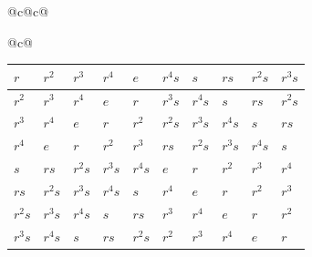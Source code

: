 \documentclass[12pt,UTF8,fontset=none]{ctexbook}
\begin{document}
\begin{figure}[!htbp]
\begin{tabular}{@{}c@{\hspace{4pt}}c@{}}
\begin{tabular}{@{}c@{}}
\begin{tabular}{|*{10}{>{\centering\arraybackslash}p{\colwidth}|}}
                \cellcolor{c1}$r$ & \cellcolor{c2}$r^2$ & \cellcolor{c3}$r^3$ & \cellcolor{c4}$r^4$ & \cellcolor{c0}$e$ & \cellcolor{c9}$r^4s$ & \cellcolor{c5}$s$ & \cellcolor{c6}$rs$ & \cellcolor{c7}$r^2s$ & \cellcolor{c8}$r^3s$ \\ \hline
                
                \cellcolor{c2}$r^2$ & \cellcolor{c3}$r^3$ & \cellcolor{c4}$r^4$ & \cellcolor{c0}$e$ & \cellcolor{c1}$r$ & \cellcolor{c8}$r^3s$ & \cellcolor{c9}$r^4s$ & \cellcolor{c5}$s$ & \cellcolor{c6}$rs$ & \cellcolor{c7}$r^2s$ \\ \hline
                
                \cellcolor{c3}$r^3$ & \cellcolor{c4}$r^4$ & \cellcolor{c0}$e$ & \cellcolor{c1}$r$ & \cellcolor{c2}$r^2$ & \cellcolor{c7}$r^2s$ & \cellcolor{c8}$r^3s$ & \cellcolor{c9}$r^4s$ & \cellcolor{c5}$s$ & \cellcolor{c6}$rs$ \\ \hline
                
                \cellcolor{c4}$r^4$ & \cellcolor{c0}$e$ & \cellcolor{c1}$r$ & \cellcolor{c2}$r^2$ & \cellcolor{c3}$r^3$ & \cellcolor{c6}$rs$ & \cellcolor{c7}$r^2s$ & \cellcolor{c8}$r^3s$ & \cellcolor{c9}$r^4s$ & \cellcolor{c5}$s$ \\ \hline
                
                \cellcolor{c5}$s$ & \cellcolor{c6}$rs$ & \cellcolor{c7}$r^2s$ & \cellcolor{c8}$r^3s$ & \cellcolor{c9}$r^4s$ & \cellcolor{c0}$e$ & \cellcolor{c1}$r$ & \cellcolor{c2}$r^2$ & \cellcolor{c3}$r^3$ & \cellcolor{c4}$r^4$ \\ \hline
                
                \cellcolor{c6}$rs$ & \cellcolor{c7}$r^2s$ & \cellcolor{c8}$r^3s$ & \cellcolor{c9}$r^4s$ & \cellcolor{c5}$s$ & \cellcolor{c4}$r^4$ & \cellcolor{c0}$e$ & \cellcolor{c1}$r$ & \cellcolor{c2}$r^2$ & \cellcolor{c3}$r^3$ \\ \hline
                
                \cellcolor{c7}$r^2s$ & \cellcolor{c8}$r^3s$ & \cellcolor{c9}$r^4s$ & \cellcolor{c5}$s$ & \cellcolor{c6}$rs$ & \cellcolor{c3}$r^3$ & \cellcolor{c4}$r^4$ & \cellcolor{c0}$e$ & \cellcolor{c1}$r$ & \cellcolor{c2}$r^2$ \\ \hline
                
                \cellcolor{c8}$r^3s$ & \cellcolor{c9}$r^4s$ & \cellcolor{c5}$s$ & \cellcolor{c6}$rs$ & \cellcolor{c7}$r^2s$ & \cellcolor{c2}$r^2$ & \cellcolor{c3}$r^3$ & \cellcolor{c4}$r^4$ & \cellcolor{c0}$e$ & \cellcolor{c1}$r$ \\ \hline
                

\end{tabular}
\end{tabular}
\end{tabular}
\end{figure}
\end{document}
